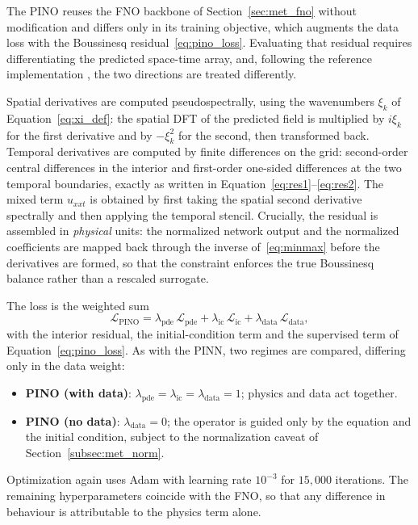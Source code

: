 The PINO reuses the FNO backbone of Section~\ref{sec:met_fno} without modification and differs only in its training objective, which augments the data loss with the Boussinesq residual~\eqref{eq:pino_loss}. Evaluating that residual requires differentiating the predicted space-time array, and, following the reference implementation \parencite{li2023pino_code}, the two directions are treated differently.

Spatial derivatives are computed pseudospectrally, using the wavenumbers $\xi_k$ of Equation~\eqref{eq:xi_def}: the spatial DFT of the predicted field is multiplied by $i\xi_k$ for the first derivative and by $-\xi_k^2$ for the second, then transformed back. Temporal derivatives are computed by finite differences on the grid: second-order central differences in the interior and first-order one-sided differences at the two temporal boundaries, exactly as written in Equation~\eqref{eq:res1}--\eqref{eq:res2}. The mixed term $u_{xxt}$ is obtained by first taking the spatial second derivative spectrally and then applying the temporal stencil. Crucially, the residual is assembled in \emph{physical} units: the normalized network output and the normalized coefficients are mapped back through the inverse of~\eqref{eq:minmax} before the derivatives are formed, so that the constraint enforces the true Boussinesq balance rather than a rescaled surrogate.

The loss is the weighted sum
\begin{equation}\label{eq:met_pino_loss}
    \mathcal{L}_{\text{PINO}} = \lambda_{\text{pde}}\, \mathcal{L}_{\text{pde}} + \lambda_{\text{ic}}\, \mathcal{L}_{\text{ic}} + \lambda_{\text{data}}\, \mathcal{L}_{\text{data}},
\end{equation}
with the interior residual, the initial-condition term and the supervised term of Equation~\eqref{eq:pino_loss}. As with the PINN, two regimes are compared, differing only in the data weight:
\begin{itemize}
    \item \textbf{PINO (with data)}: $\lambda_{\text{pde}} = \lambda_{\text{ic}} = \lambda_{\text{data}} = 1$; physics and data act together.
    \item \textbf{PINO (no data)}: $\lambda_{\text{data}} = 0$; the operator is guided only by the equation and the initial condition, subject to the normalization caveat of Section~\ref{subsec:met_norm}.
\end{itemize}
Optimization again uses Adam with learning rate $10^{-3}$ for $15{,}000$ iterations. The remaining hyperparameters coincide with the FNO, so that any difference in behaviour is attributable to the physics term alone.

